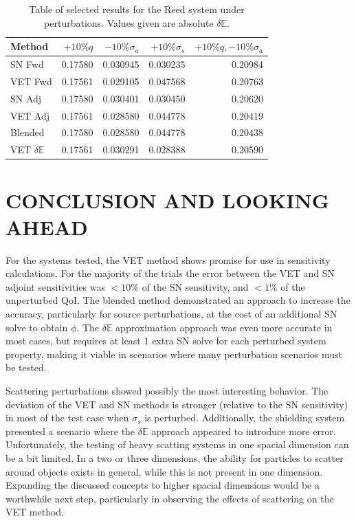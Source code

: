 \documentclass[12pt]{report}
\newcommand{\Edd}{\mathbb{E}}
\newcommand{\sigs}{\sigma_s}
\newcommand{\siga}{\sigma_a}
\begin{document}
\begin{table}[H]
\centering
  \begin{tabular}{| l | r | r | r | r |}
    \hline
    Method  &  $+10\% q $  & $-10\% \siga $ & $+10\% \sigs $ & $+10\% q,-10\% \siga$ \\ \hline
     SN Fwd 			&0.17580 &0.030945 &0.030235 & 0.20984\\ \hline
     VET Fwd 			&0.17561 &0.029105 &0.047568 &0.20763\\ \hline
     SN Adj 			&0.17580 &0.030401 &0.030450 &0.20620\\ \hline
     VET Adj 			&0.17561 &0.028580 &0.044778 &0.20419\\ \hline
     Blended 			&0.17580 &0.028580 &0.044778 &0.20438\\ \hline
     VET $\delta \Edd$ 	&0.17561 &0.030291 &0.028388 &0.20590\\ \hline
    \end{tabular}
  \caption{Table of selected results for the Reed system under perturbations. Values given are absolute $\delta \Edd$. }
\end{table}

\chapter{\uppercase {Conclusion and looking ahead}}

For the systems tested, the VET method shows promise for use in sensitivity calculations. For the majority of the trials the error between the VET and SN adjoint sensitivities was $<10\%$ of the SN sensitivity, and $<1\%$ of the unperturbed QoI. The blended method demonstrated an approach to increase the accuracy, particularly for source perturbations, at the cost of an additional SN solve to obtain $\phi$. The $\delta \Edd$ approximation approach was even more accurate in most cases, but requires at least 1 extra SN solve for each perturbed system property, making it viable in scenarios where many perturbation scenarios must be tested. 

Scattering perturbations showed possibly the most interesting behavior. The deviation of the VET and SN methods is stronger (relative to the SN sensitivity) in most of the test case when $\sigs$ is perturbed. Additionally, the shielding system presented a scenario where the $\delta \Edd$ approach appeared to introduce more error. Unfortunately, the testing of heavy scatting systems in one spacial dimension can be a bit limited. In a two or three dimensions, the ability for particles to scatter around objects exists in general, while this is not present in one dimension. Expanding the discussed concepts to higher spacial dimensions would be a worthwhile next step, particularly in observing the effects of scattering on the VET method.
\end{document}
